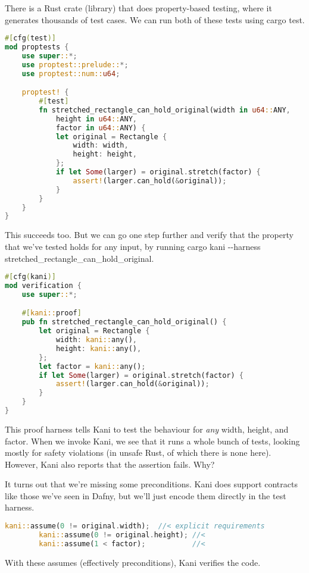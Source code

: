 \documentclass[11pt]{article}
\begin{document}
There is a Rust crate (library) that does property-based testing, where it generates thousands of test cases. We can run both of these tests using \textsf{cargo test}.
\begin{lstlisting}[language=Rust]
#[cfg(test)]
mod proptests {
    use super::*;
    use proptest::prelude::*;
    use proptest::num::u64;

    proptest! {
        #[test]
        fn stretched_rectangle_can_hold_original(width in u64::ANY,
            height in u64::ANY,
            factor in u64::ANY) {
            let original = Rectangle {
                width: width,
                height: height,
            };
            if let Some(larger) = original.stretch(factor) {
                assert!(larger.can_hold(&original));
            }
        }
    }
}
\end{lstlisting}
This succeeds too. But we can go one step further and verify that the property that we've tested holds for any input, by running
\textsf{cargo kani -{}-harness stretched\_rectangle\_can\_hold\_original}.
\begin{lstlisting}[language=Rust]
#[cfg(kani)]
mod verification {
    use super::*;

    #[kani::proof]
    pub fn stretched_rectangle_can_hold_original() {
        let original = Rectangle {
            width: kani::any(),
            height: kani::any(),
        };
        let factor = kani::any();
        if let Some(larger) = original.stretch(factor) {
            assert!(larger.can_hold(&original));
        }
    }
}
\end{lstlisting}
This proof harness tells Kani to test the behaviour for \emph{any}
width, height, and factor.  When we invoke Kani, we see that it runs a
whole bunch of tests, looking mostly for safety violations (in unsafe
Rust, of which there is none here).  However, Kani also reports that
the assertion fails. Why?

It turns out that we're missing some preconditions. Kani does support
contracts like those we've seen in Dafny, but we'll just encode them
directly in the test harness.

\begin{lstlisting}[language=Rust]
        kani::assume(0 != original.width);  //< explicit requirements
        kani::assume(0 != original.height); //<
        kani::assume(1 < factor);           //<
\end{lstlisting}

With these \textsf{assume}s (effectively preconditions), Kani verifies the code.
\end{document}
